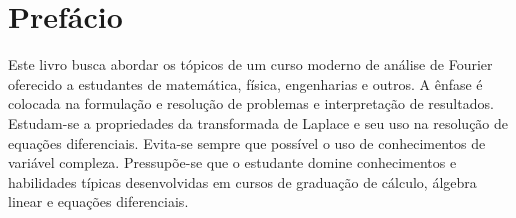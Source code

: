 
\chapter*{Prefácio}

Este livro busca abordar os tópicos de um curso moderno de análise de Fourier oferecido a estudantes de matemática, física, engenharias e outros. A ênfase é colocada na formulação e resolução de problemas e interpretação de resultados. Estudam-se a propriedades da transformada de Laplace e seu uso na resolução de equações diferenciais. Evita-se sempre que possível o uso de conhecimentos de variável compleza. Pressupõe-se que o estudante domine conhecimentos e habilidades típicas desenvolvidas em cursos de graduação de cálculo, álgebra linear e equações diferenciais. 

